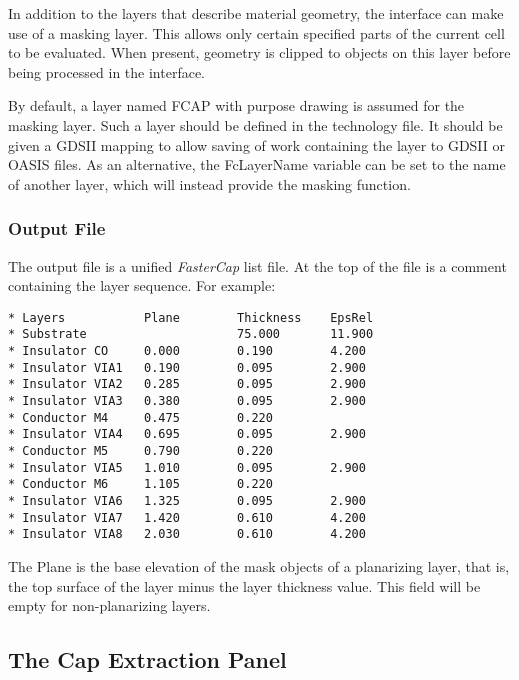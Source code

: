 In addition to the layers that describe material geometry, the
interface can make use of a masking layer.  This allows only certain
specified parts of the current cell to be evaluated.  When present,
geometry is clipped to objects on this layer before being processed in
the interface.

By default, a layer named {\vt FCAP} with purpose {\vt drawing} is
assumed for the masking layer.  Such a layer should be defined in the
technology file.  It should be given a GDSII mapping to allow saving
of work containing the layer to GDSII or OASIS files.  As an
alternative, the {\et FcLayerName} variable can be set to the name of
another layer, which will instead provide the masking function.


\subsubsection{Output File}

The output file is a unified {\it FasterCap} list file.  At the top of
the file is a comment containing the layer sequence.  For example:

\begin{verbatim}
* Layers           Plane        Thickness    EpsRel
* Substrate                     75.000       11.900
* Insulator CO     0.000        0.190        4.200
* Insulator VIA1   0.190        0.095        2.900
* Insulator VIA2   0.285        0.095        2.900
* Insulator VIA3   0.380        0.095        2.900
* Conductor M4     0.475        0.220
* Insulator VIA4   0.695        0.095        2.900
* Conductor M5     0.790        0.220
* Insulator VIA5   1.010        0.095        2.900
* Conductor M6     1.105        0.220
* Insulator VIA6   1.325        0.095        2.900
* Insulator VIA7   1.420        0.610        4.200
* Insulator VIA8   2.030        0.610        4.200
\end{verbatim}

The {\vt Plane} is the base elevation of the mask objects of a
planarizing layer, that is, the top surface of the layer minus the
layer thickness value.  This field will be empty for non-planarizing
layers.


\subsection{The Cap Extraction Panel}
\label{fcpanel}

